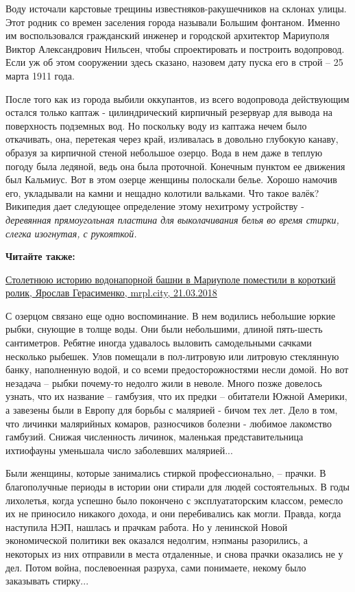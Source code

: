 Воду источали карстовые трещины известняков-ракушечников на склонах улицы. Этот
родник со времен заселения города называли Большим фонтаном. Именно им
воспользовался гражданский инженер и городской архитектор Мариуполя Виктор
Александрович Нильсен, чтобы спроектировать и построить водопровод. Если уж об
этом сооружении здесь сказано, назовем дату пуска его в строй – 25 марта 1911
года.

После того как из города выбили оккупантов, из всего водопровода действующим
остался только каптаж - цилиндрический кирпичный резервуар для вывода на
поверхность подземных вод. Но поскольку воду из каптажа нечем было откачивать,
она, перетекая через край, изливалась в довольно глубокую канаву, образуя за
кирпичной стеной небольшое озерцо. Вода в нем даже в теплую погоду была
ледяной, ведь она была проточной. Конечным пунктом ее движения был Кальмиус.
Вот в этом озерце женщины полоскали белье. Хорошо намочив его, укладывали на
камни и нещадно колотили вальками. Что такое валёк? Википедия дает следующее
определение этому нехитрому устройству - \emph{деревянная прямоугольная пластина для
выколачивания белья во время стирки, слегка изогнутая, с рукояткой.}

\textbf{Читайте также:} 

\href{https://mrpl.city/news/view/stoletnyuyu-istoriyu-vodonapornoj-bashni-v-mariupole-pomestili-v-korotkij-rolik-video}{%
Столетнюю историю водонапорной башни в Мариуполе поместили в короткий ролик, Ярослав Герасименко, mrpl.city, 21.03.2018}

С озерцом связано еще одно воспоминание. В нем водились небольшие юркие рыбки,
снующие в толще воды. Они были небольшими, длиной пять-шесть сантиметров.
Ребятне иногда удавалось выловить самодельными сачками несколько рыбешек. Улов
помещали в пол-литровую или литровую стеклянную банку, наполненную водой, и со
всеми предосторожностями несли домой. Но вот незадача – рыбки почему-то недолго
жили в неволе. Много позже довелось узнать, что их название – гамбузия, что их
предки – обитатели Южной Америки, а завезены были в Европу для борьбы с
малярией - бичом тех лет. Дело в том, что личинки малярийных комаров,
разносчиков болезни - любимое лакомство гамбузий. Снижая численность личинок,
маленькая представительница ихтиофауны уменьшала число заболевших малярией...

Были женщины, которые занимались стиркой профессионально, – прачки. В
благополучные периоды в истории они стирали для людей состоятельных. В годы
лихолетья, когда успешно было покончено с эксплуататорским классом, ремесло их
не приносило никакого дохода, и они перебивались как могли. Правда, когда
наступила НЭП, нашлась и прачкам работа. Но у ленинской Новой экономической
политики век оказался недолгим, нэпманы разорились, а некоторых из них
отправили в места отдаленные, и снова прачки оказались не у дел. Потом война,
послевоенная разруха, сами понимаете, некому было заказывать стирку...


